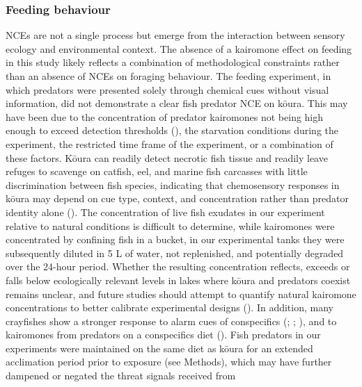 \documentclass[
  letterpaper,
  DIV=11,
  numbers=noendperiod]{scrartcl}
\begin{document}
\subsubsection{Feeding behaviour}\label{feeding-behaviour}

NCEs are not a single process but emerge from the interaction between
sensory ecology and environmental context. The absence of a kairomone
effect on feeding in this study likely reflects a combination of
methodological constraints rather than an absence of NCEs on foraging
behaviour. The feeding experiment, in which predators were presented
solely through chemical cues without visual information, did not
demonstrate a clear fish predator NCE on kōura. This may have been due
to the concentration of predator kairomones not being high enough to
exceed detection thresholds (), the starvation conditions during the experiment, the restricted
time frame of the experiment, or a combination of these factors. Kōura
can readily detect necrotic fish tissue and readily leave refuges to
scavenge on catfish, eel, and marine fish carcasses with little
discrimination between fish species, indicating that chemosensory
responses in kōura may depend on cue type, context, and concentration
rather than predator identity alone (). The concentration of live fish exudates in our experiment
relative to natural conditions is difficult to determine, while
kairomones were concentrated by confining fish in a bucket, in our
experimental tanks they were subsequently diluted in 5 L of water, not
replenished, and potentially degraded over the 24-hour period. Whether
the resulting concentration reflects, exceeds or falls below
ecologically relevant levels in lakes where kōura and predators coexist
remains unclear, and future studies should attempt to quantify natural
kairomone concentrations to better calibrate experimental designs
(). In addition,
many crayfishes show a stronger response to alarm cues of conspecifics
(;
;
), and to
kairomones from predators on a conspecifics diet
(). Fish predators in
our experiments were maintained on the same diet as kōura for an
extended acclimation period prior to exposure (see Methods), which may
have further dampened or negated the threat signals received from
\end{document}
